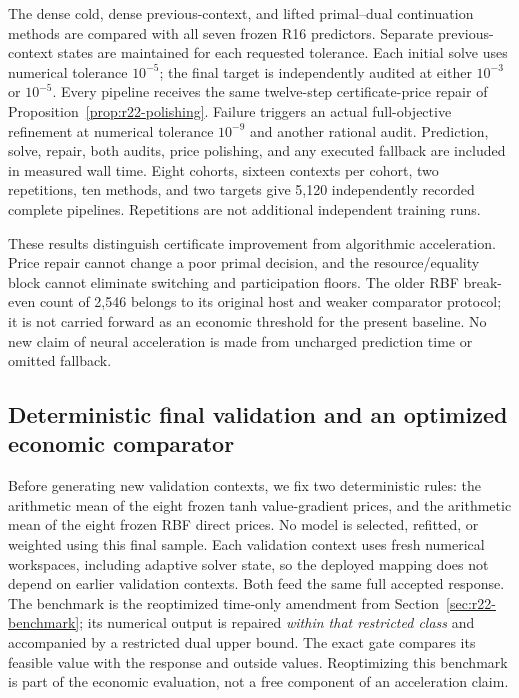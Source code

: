 The dense cold, dense previous-context, and lifted primal--dual continuation methods are compared with all seven frozen R16 predictors. Separate previous-context states are maintained for each requested tolerance. Each initial solve uses numerical tolerance $10^{-5}$; the final target is independently audited at either $10^{-3}$ or $10^{-5}$. Every pipeline receives the same twelve-step certificate-price repair of Proposition~\ref{prop:r22-polishing}. Failure triggers an actual full-objective refinement at numerical tolerance $10^{-9}$ and another rational audit. Prediction, solve, repair, both audits, price polishing, and any executed fallback are included in measured wall time. Eight cohorts, sixteen contexts per cohort, two repetitions, ten methods, and two targets give 5,120 independently recorded complete pipelines. Repetitions are not additional independent training runs.



These results distinguish certificate improvement from algorithmic acceleration. Price repair cannot change a poor primal decision, and the resource/equality block cannot eliminate switching and participation floors. The older RBF break-even count of 2,546 belongs to its original host and weaker comparator protocol; it is not carried forward as an economic threshold for the present baseline. No new claim of neural acceleration is made from uncharged prediction time or omitted fallback.

\subsection{Deterministic final validation and an optimized economic comparator}
Before generating new validation contexts, we fix two deterministic rules: the arithmetic mean of the eight frozen tanh value-gradient prices, and the arithmetic mean of the eight frozen RBF direct prices. No model is selected, refitted, or weighted using this final sample. Each validation context uses fresh numerical workspaces, including adaptive solver state, so the deployed mapping does not depend on earlier validation contexts. Both feed the same full accepted response. The benchmark is the reoptimized time-only amendment from Section~\ref{sec:r22-benchmark}; its numerical output is repaired \emph{within that restricted class} and accompanied by a restricted dual upper bound. The exact gate compares its feasible value with the response and outside values. Reoptimizing this benchmark is part of the economic evaluation, not a free component of an acceleration claim.

